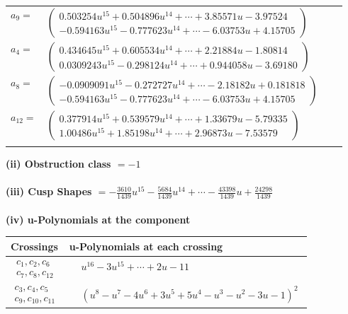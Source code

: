 \documentclass[1p]{elsarticle_modified}
\theoremstyle{definition}
\begin{document}
\begin{tabular}{m{7pt} m{180pt} m{7pt} m{180pt} }
\flushright $a_{9}=$&$\begin{pmatrix}0.503254 u^{15}+0.504896 u^{14}+\cdots+3.85571 u-3.97524\\-0.594163 u^{15}-0.777623 u^{14}+\cdots-6.03753 u+4.15705\end{pmatrix}$ \\
\flushright $a_{4}=$&$\begin{pmatrix}0.434645 u^{15}+0.605534 u^{14}+\cdots+2.21884 u-1.80814\\0.0309243 u^{15}-0.298124 u^{14}+\cdots+0.944058 u-3.69180\end{pmatrix}$ \\
\flushright $a_{8}=$&$\begin{pmatrix}-0.0909091 u^{15}-0.272727 u^{14}+\cdots-2.18182 u+0.181818\\-0.594163 u^{15}-0.777623 u^{14}+\cdots-6.03753 u+4.15705\end{pmatrix}$ \\
\flushright $a_{12}=$&$\begin{pmatrix}0.377914 u^{15}+0.539579 u^{14}+\cdots+1.33679 u-5.79335\\1.00486 u^{15}+1.85198 u^{14}+\cdots+2.96873 u-7.53579\end{pmatrix}$\\&\end{tabular}
\flushleft \textbf{(ii) Obstruction class $= -1$}\\~\\
\flushleft \textbf{(iii) Cusp Shapes $= -\frac{3610}{1439} u^{15}-\frac{5684}{1439} u^{14}+\cdots-\frac{43398}{1439} u+\frac{24298}{1439}$}\\~\\
\newpage\renewcommand{\arraystretch}{1}
\flushleft \textbf{(iv) u-Polynomials at the component}\newline \\
\begin{tabular}{m{50pt}|m{274pt}}
Crossings & \hspace{64pt}u-Polynomials at each crossing \\
\hline $$\begin{aligned}c_{1},c_{2},c_{6}\\c_{7},c_{8},c_{12}\end{aligned}$$&$\begin{aligned}
&u^{16}-3 u^{15}+\cdots+2 u-11
\end{aligned}$\\
\hline $$\begin{aligned}c_{3},c_{4},c_{5}\\c_{9},c_{10},c_{11}\end{aligned}$$&$\begin{aligned}
&(u^8- u^7-4 u^6+3 u^5+5 u^4- u^3- u^2-3 u-1)^2
\end{aligned}$\\
\hline
\end{tabular}\\~\\
\end{document}
